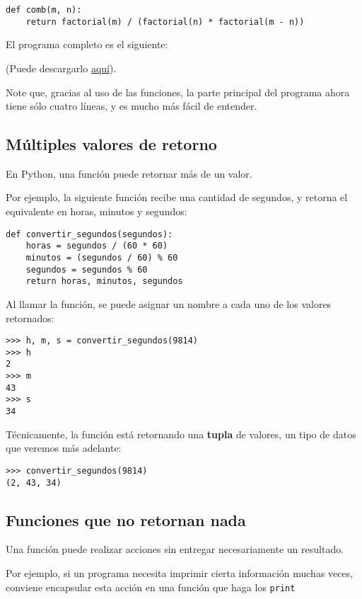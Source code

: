 \begin{lstlisting}
def comb(m, n):
    return factorial(m) / (factorial(n) * factorial(m - n))
\end{lstlisting}

El programa completo es el siguiente:

(Puede descargarlo \href{../\_static/programas/combinatorios.py}{aquí}).

Note que, gracias al uso de las funciones, la parte principal del
programa ahora tiene sólo cuatro líneas, y es mucho más fácil de
entender.

\subsection{Múltiples valores de retorno}

En Python, una función puede retornar más de un valor.

Por ejemplo, la siguiente función recibe una cantidad de segundos, y
retorna el equivalente en horas, minutos y segundos:

\begin{lstlisting}
def convertir_segundos(segundos):
    horas = segundos / (60 * 60)
    minutos = (segundos / 60) % 60
    segundos = segundos % 60
    return horas, minutos, segundos
\end{lstlisting}

Al llamar la función, se puede asignar un nombre a cada uno de los
valores retornados:

\begin{lstlisting}
>>> h, m, s = convertir_segundos(9814)
>>> h
2
>>> m
43
>>> s
34
\end{lstlisting}

Técnicamente, la función está retornando una \textbf{tupla} de valores,
un tipo de datos que veremos más adelante:

\begin{lstlisting}
>>> convertir_segundos(9814)
(2, 43, 34)
\end{lstlisting}

\subsection{Funciones que no retornan nada}

Una función puede realizar acciones sin entregar necesariamente un
resultado.

Por ejemplo, si un programa necesita imprimir cierta información muchas
veces, conviene encapsular esta acción en una función que haga los
\lstinline!print!

